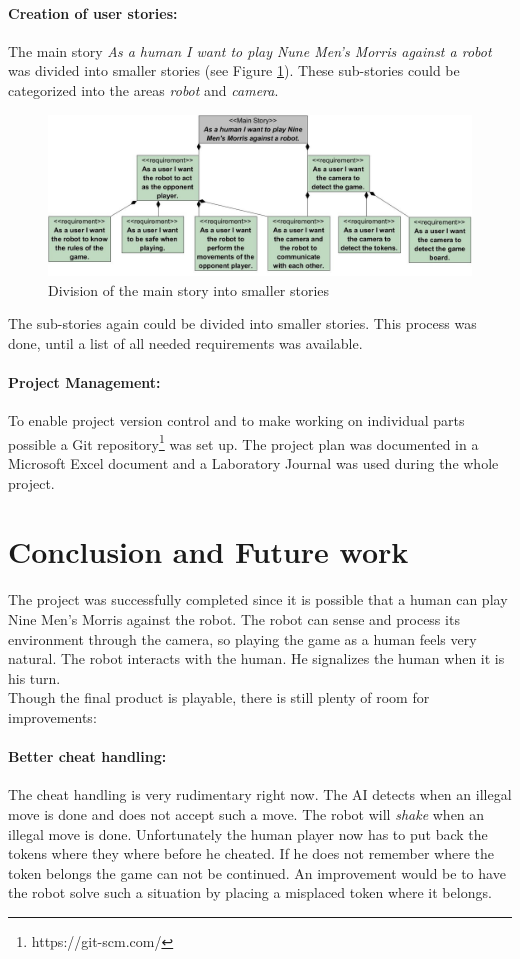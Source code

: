 \documentclass[a4paper]{spie}  %
\begin{document}
\begin{large}
\paragraph{Creation of user stories:} The main story \emph{As a human I want to play Nune Men's Morris against a robot} was divided into smaller stories (see Figure \ref{stories}). These sub-stories could be categorized into the areas \emph{robot} and \emph{camera}.
\begin{figure}[h]
\includegraphics[width=15cm]{images/stories.jpg}
\centering
\caption{Division of the main story into smaller stories}
\label{stories}
\end{figure}
The sub-stories again could be divided into smaller stories. This process was done, until a list of all needed requirements was available.\\
\paragraph{Project Management:} To enable project version control and to make working on individual parts possible a Git repository\footnote{https://git-scm.com/} was set up. The project plan was documented in a Microsoft Excel document and a Laboratory Journal was used during the whole project.

\clearpage
\section{Conclusion and Future work}
The project was successfully completed since it is possible that a human can play Nine Men's Morris against the robot. The robot can sense and process its environment through the camera, so playing the game as a human feels very natural. The robot interacts with the human. He signalizes the human when it is his turn. \\ 
Though the final product is playable, there is still plenty of room for improvements:
\paragraph{Better cheat handling:} The cheat handling is very rudimentary right now. The AI detects when an illegal move is done and does not accept such a move. The robot will \emph{shake} when an illegal move is done. Unfortunately the human player now has to put back the tokens where they where before he cheated. If he does not remember where the token belongs the game can not be continued. An improvement would be to have the robot solve such a situation by placing a misplaced token where it belongs.

\end{large}
\end{document}
